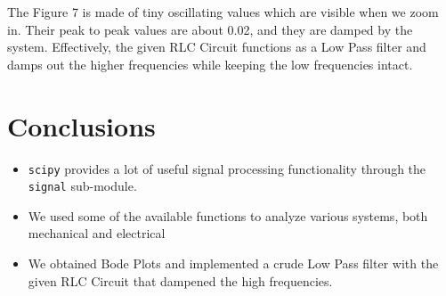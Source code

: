 \documentclass[12pt]{article}
\begin{document}
The Figure 7 is made of tiny oscillating values which are visible when we zoom in.
Their peak to peak values are about 0.02, and they are damped by the system. Effectively, the given RLC Circuit functions as a Low Pass filter and damps out the higher frequencies while keeping the low frequencies intact.

\section{Conclusions}
\begin{itemize}
    \item \texttt{scipy} provides a lot of useful signal processing functionality through the \texttt{signal} sub-module. 
    \item We used some of the available functions to analyze various systems, both mechanical and electrical
    \item We obtained Bode Plots and implemented a crude Low Pass filter with the given RLC Circuit that dampened the high frequencies.
\end{itemize}
\end{document}
